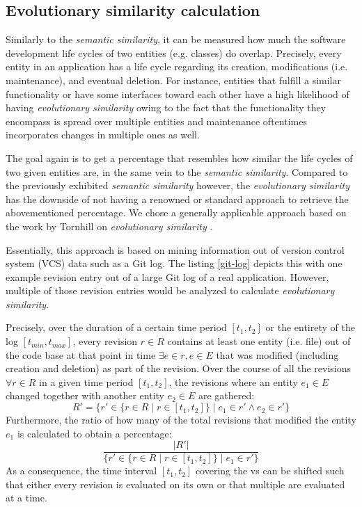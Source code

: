 \documentclass[12pt,a4paper]{report}
\begin{document}
\subsection{Evolutionary similarity calculation} \label{subsect:evolutionary-similarity}

Similarly to the \textit{semantic similarity}, it can be measured how much the
software development life cycles of two entities (e.g. classes) do overlap.
Precisely, every entity in an application has a life cycle regarding
its creation, modifications (i.e. maintenance), and eventual deletion.
For instance, entities that fulfill a similar functionality or have some
interfaces toward each other have a high likelihood of having
\textit{evolutionary similarity} owing to the fact that the functionality
they encompass is spread over multiple entities and maintenance oftentimes
incorporates changes in multiple ones as well.

The goal again is to get a percentage that resembles how similar the life cycles
of two given entities are, in the same vein to the \textit{semantic similarity}.
Compared to the previously exhibited \textit{semantic similarity} however,
the \textit{evolutionary similarity} has the downside of not having a renowned
or standard approach to retrieve the abovementioned percentage.
We chose a generally applicable approach based on the work by Tornhill
on \textit{evolutionary similarity} \cite{tornhill2015crimescene}.

Essentially, this approach is based on mining information out of
version control system (VCS) data such as a Git log.
The listing \ref{git-log} depicts this with one example revision entry
out of a large Git log of a real application. However, multiple of those
revision entries would be analyzed to calculate \textit{evolutionary similarity}.

Precisely, over the duration of a certain time period \([t_1, t_2]\)
or the entirety of the log \([t_{min}, t_{max}]\), every revision \(r \in R\)
contains at least one entity (i.e. file) out of the code base at that point
in time \(\exists e \in r, e \in E\) that was modified
(including creation and deletion) as part of the revision.
Over the course of all the revisions \(\forall r \in R\) in a given time period
\([t_1, t_2]\), the revisions where an entity \(e_1 \in E\) changed together
with another entity \(e_2 \in E\) are gathered:
\[
  R' = \{ r' \in \{ r \in R \mid r \in [t_1, t_2] \} \mid e_1 \in r' \land e_2 \in r' \}
\]
Furthermore, the ratio of how many of the total revisions that modified
the entity \(e_1\) is calculated to obtain a percentage:
\[
  \frac{\vert R' \vert}{\{ r' \in \{ r \in R \mid r \in [t_1, t_2] \} \mid e_1 \in r' \}}
\]
As a consequence, the time interval \([t_1, t_2]\) covering the vs can be
shifted such that either every revision is evaluated on its own or that multiple
are evaluated at a time.
\end{document}

